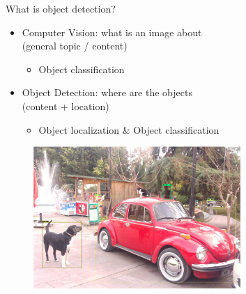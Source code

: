 \begin{frame}{What is object detection?}
    \begin{itemize}
        \item Computer Vision: what is an image about \\
            (general topic / content)
        \begin{itemize}
            \item Object classification
        \end{itemize}
        \item Object Detection: where are the objects\\
            (content + location)
        \begin{itemize}
            \item Object localization \& Object classification
        \end{itemize}
    \end{itemize}
    \begin{figure}
        \begin{center}
            \includegraphics[width=0.7\textwidth]{images/Image_ObjectDetection.png}
        \end{center}
    \end{figure}
\end{frame}

